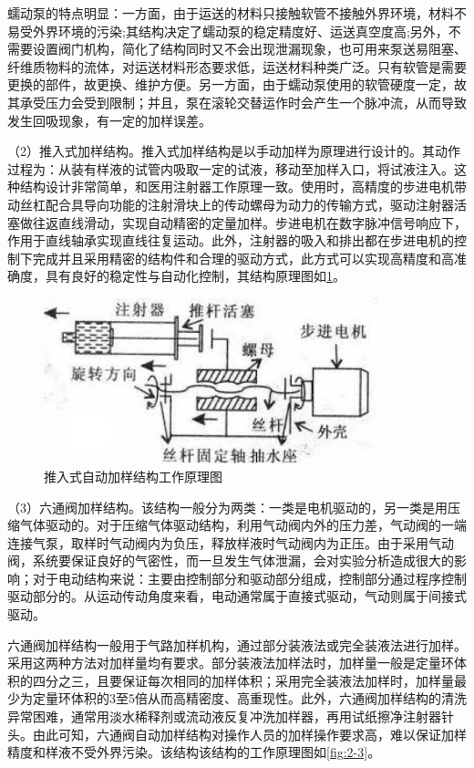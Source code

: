 蠕动泵的特点明显：一方面，由于运送的材料只接触软管不接触外界环境，材料不易受外界环境的污染;其结构决定了蠕动泵的稳定精度好、运送真空度高;另外，不需要设置阀门机构，简化了结构同时又不会出现泄漏现象，也可用来泵送易阻塞、纤维质物料的流体\supercite{bib4}，对运送材料形态要求低，运送材料种类广泛。只有软管是需要更换的部件，故更换、维护方便。另一方面，由于蠕动泵使用的软管硬度一定，故其承受压力会受到限制；并且，泵在滚轮交替运作时会产生一个脉冲流，从而导致发生回吸现象，有一定的加样误差。

（2）推入式加样结构。推入式加样结构是以手动加样为原理进行设计的。其动作过程为：从装有样液的试管内吸取一定的试液，移动至加样入口，将试液注入。这种结构设计非常简单，和医用注射器工作原理一致。使用时，高精度的步进电机带动丝杠配合具导向功能的注射滑块上的传动螺母为动力的传输方式，驱动注射器活塞做往返直线滑动，实现自动精密的定量加样。步进电机在数字脉冲信号响应下，作用于直线轴承实现直线往复运动\supercite{bib5}。此外，注射器的吸入和排出都在步进电机的控制下完成并且采用精密的结构件和合理的驱动方式，此方式可以实现高精度和高准确度，具有良好的稳定性与自动化控制，其结构原理图如\ref{fig:2-2}。

\begin{figure}[htbp!]
  \centering
  \includegraphics[height=4.8cm]{chap/figure/2-2.jpg}
  \caption{推入式自动加样结构工作原理图}
  \label{fig:2-2}
\end{figure}

（3）六通阀加样结构。该结构一般分为两类：一类是电机驱动的，另一类是用压缩气体驱动的。对于压缩气体驱动结构，利用气动阀内外的压力差，气动阀的一端连接气泵，取样时气动阀内为负压，释放样液时气动阀内为正压。由于采用气动阀，系统要保证良好的气密性，而一旦发生气体泄漏，会对实验分析造成很大的影响；对于电动结构来说：主要由控制部分和驱动部分组成，控制部分通过程序控制驱动部分的。从运动传动角度来看，电动通常属于直接式驱动，气动则属于间接式驱动。

六通阀加样结构一般用于气路加样机构，通过部分装液法或完全装液法进行加样。采用这两种方法对加样量均有要求。部分装液法加样法时，加样量一般是定量环体积的四分之三，且要保证每次相同的加样体积；采用完全装液法加样时，加样量最少为定量环体积的3至5倍从而高精密度、高重现性。此外，六通阀加样结构的清洗异常困难，通常用淡水稀释剂或流动液反复冲洗加样器，再用试纸擦净注射器针头。由此可知，六通阀自动加样结构对操作人员的加样操作要求高，难以保证加样精度和样液不受外界污染。该结构该结构的工作原理图如\ref{fig:2-3}。

